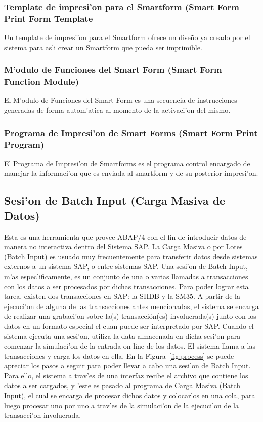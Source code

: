 \subsubsection{Template de impresi'on para el Smartform (Smart Form Print Form Template}
	Un template de impresi'on para el Smartform ofrece un dise\~no ya creado por el sistema para as'i crear un Smartform que pueda ser imprimible.
\subsubsection{M'odulo de Funciones del Smart Form (Smart Form Function Module)}
	El M'odulo de Funciones del Smart Form es una secuencia de instrucciones generadas de forma autom'atica al momento de la activaci'on del  mismo.
\subsubsection{Programa de Impresi'on de Smart Forms (Smart Form Print Program)}
	El Programa de Impresi'on de Smartforms es el programa control encargado de manejar la informaci'on que es enviada al smartform y de su posterior impresi'on. 
	
\subsection{Sesi'on de Batch Input (Carga Masiva de Datos)}
	Esta es una herramienta que provee ABAP/4 con el fin de introducir datos de manera no interactiva dentro del Sistema SAP. La Carga Masiva o por Lotes (Batch Input) es usuado muy frecuentemente para transferir datos desde sistemas externos a un sistema SAP, o entre sistemas SAP. Una sesi'on de Batch Input, m'as espec'ificamente, es un conjunto de una o varias llamadas a transacciones con los datos a ser procesados por dichas transacciones.  
	Para poder lograr esta tarea, existen dos transacciones en SAP: la SHDB y la SM35. A partir de la ejecuci'on de alguna de las transacciones antes mencionadas, el sistema se encarga de realizar una grabaci'on sobre la(s) transacción(es) involucrada(s) junto con los datos en un formato especial el cuan puede ser interpretado por SAP. Cuando el sistema ejecuta una sesi'on, utiliza la data almacenada en dicha sesi'on para comenzar la simulaci'on de la entrada on-line de los datos. El sistema llama a las transacciones y carga los datos en ella. En la Figura~\ref{fig:process}  se puede apreciar los pasos a seguir para poder llevar a cabo una sesi'on de Batch Input. Para ello, el sistema a trav'es de una interfaz recibe el archivo que contiene los datos a ser cargados, y 'este es pasado al programa de Carga Masiva (Batch Input), el cual se encarga de procesar dichos datos y colocarlos en una cola, para luego procesar uno por uno a trav'es de la simulaci'on de la ejecuci'on de la transacci'on involucrada. 

